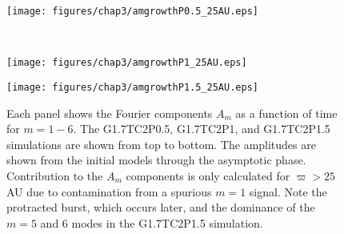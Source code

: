 \begin{figure}[p]
\centering
{}
\begin{minipage}[t]{6.3in}
\centering
\texttt{[image: figures/chap3/amgrowthP0.5\_25AU.eps]}
\end{minipage}\\
\begin{minipage}[t]{6.3in}
\centering
\texttt{[image: figures/chap3/amgrowthP1\_25AU.eps]}
\end{minipage}
\begin{minipage}[t]{6.3in}
\centering
\texttt{[image: figures/chap3/amgrowthP1.5\_25AU.eps]}
\end{minipage}
\caption[Fourier components as a function of time for different initial surface density profiles]{Each panel shows the Fourier components $A_m$ as a function of time for $m = 1 - 6$. The G1.7TC2P0.5, G1.7TC2P1, and G1.7TC2P1.5 simulations are shown from top to bottom. The amplitudes are shown from the initial models through the asymptotic phase. Contribution to the $A_m$ components is only calculated for $\varpi > 25$ AU due to contamination from a spurious $m = 1$ signal. Note the protracted burst, which occurs later, and the dominance of the $m = 5$ and $6$ modes in the G1.7TC2P1.5 simulation.}
\label{fig:IC:amt}
\end{figure}

